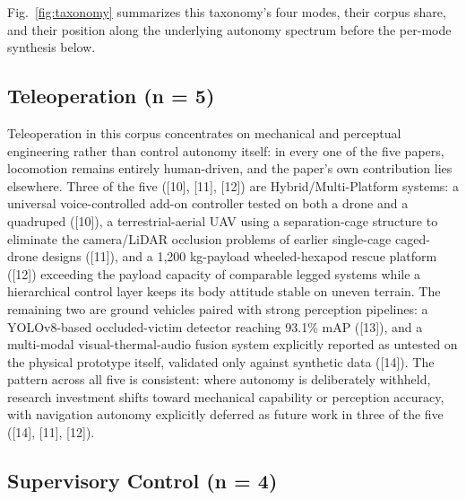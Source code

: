 \documentclass[journal]{IEEEtran}
\begin{document}
Fig.~\ref{fig:taxonomy} summarizes this taxonomy's four modes, their corpus share, and their position along the underlying autonomy spectrum before the per-mode synthesis below.

\subsection{Teleoperation (n = 5)}

Teleoperation in this corpus concentrates on mechanical and perceptual engineering rather than control autonomy itself: in every one of the five papers, locomotion remains entirely human-driven, and the paper's own contribution lies elsewhere. Three of the five ([10], [11], [12]) are Hybrid/Multi-Platform systems: a universal voice-controlled add-on controller tested on both a drone and a quadruped ([10]), a terrestrial-aerial UAV using a separation-cage structure to eliminate the camera/LiDAR occlusion problems of earlier single-cage caged-drone designs ([11]), and a 1,200 kg-payload wheeled-hexapod rescue platform ([12]) exceeding the payload capacity of comparable legged systems while a hierarchical control layer keeps its body attitude stable on uneven terrain. The remaining two are ground vehicles paired with strong perception pipelines: a YOLOv8-based occluded-victim detector reaching 93.1\% mAP ([13]), and a multi-modal visual-thermal-audio fusion system explicitly reported as untested on the physical prototype itself, validated only against synthetic data ([14]). The pattern across all five is consistent: where autonomy is deliberately withheld, research investment shifts toward mechanical capability or perception accuracy, with navigation autonomy explicitly deferred as future work in three of the five ([14], [11], [12]).

\subsection{Supervisory Control (n = 4)}
\end{document}
